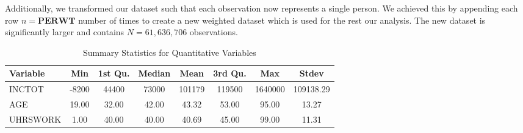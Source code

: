 \documentclass{article}
\begin{document}
Additionally, we transformed our dataset such that each observation now represents a single person. We achieved this by appending each row $n = \mathbf{PERWT}$ number of times to create a new weighted dataset which is used for the rest our analysis. The new dataset is significantly larger and contains $N = 61,636,706$ observations.

\begin{table}[ht]
    \centering
    \caption{Summary Statistics for Quantitative Variables}
    \begin{tabular}{@{}lccccccc@{}}
    \toprule
    Variable & Min & 1st Qu. & Median & Mean & 3rd Qu. & Max & Stdev \\ 
    \midrule
    INCTOT   & -8200 & 44400 & 73000 & 101179 & 119500 & 1640000 & 109138.29 \\
    AGE      & 19.00 & 32.00 & 42.00 & 43.32 & 53.00 & 95.00 & 13.27 \\
    UHRSWORK & 1.00 & 40.00 & 40.00 & 40.69 & 45.00 & 99.00 & 11.31 \\
    \bottomrule
    \end{tabular}
    \end{table}
    \newpage
    
\end{document}
